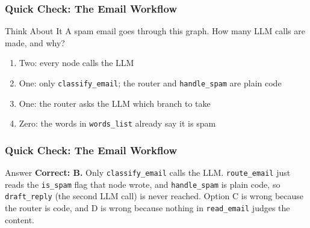 \begin{frame}[fragile]\frametitle{Quick Check: The Email Workflow}
\begin{block}{Think About It}
A spam email goes through this graph. How many LLM calls are made, and why?
\begin{enumerate}
  \item[A.] Two: every node calls the LLM
  \item[B.] One: only \texttt{classify\_email}; the router and \texttt{handle\_spam} are plain code
  \item[C.] One: the router asks the LLM which branch to take
  \item[D.] Zero: the words in \texttt{words\_list} already say it is spam
\end{enumerate}
\end{block}
\end{frame}

\begin{frame}[fragile]\frametitle{Quick Check: The Email Workflow}
\begin{block}{Answer}
\textbf{Correct: B.} Only \texttt{classify\_email} calls the LLM. \texttt{route\_email} just reads the \texttt{is\_spam} flag that node wrote, and \texttt{handle\_spam} is plain code, so \texttt{draft\_reply} (the second LLM call) is never reached. Option C is wrong because the router is code, and D is wrong because nothing in \texttt{read\_email} judges the content.
\end{block}
\end{frame}
